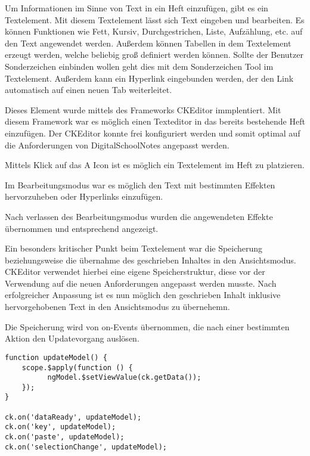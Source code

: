 Um Informationen im Sinne von Text in ein Heft einzufügen, gibt es ein Textelement. Mit diesem Textelement lässt sich Text eingeben und bearbeiten. Es können Funktionen wie Fett, Kursiv, Durchgestrichen, Liste, Aufzählung, etc. auf den Text angewendet werden. Außerdem können Tabellen in dem Textelement erzeugt werden, welche beliebig groß definiert werden können. Sollte der Benutzer Sonderzeichen einbinden wollen geht dies mit dem Sonderzeichen Tool im Textelement. Außerdem kann ein Hyperlink eingebunden werden, der den Link automatisch auf einen neuen Tab weiterleitet.

Dieses Element wurde mittels des Frameworks CKEditor immplentiert. Mit diesem Framework war es möglich einen Texteditor in das bereits bestehende Heft einzufügen. Der CKEditor konnte frei konfiguriert werden und somit optimal auf die Anforderungen von DigitalSchoolNotes angepasst werden.

Mittels Klick auf das A Icon ist es möglich ein Textelement im Heft zu platzieren.

Im Bearbeitungsmodus war es möglich den Text mit bestimmten Effekten hervorzuheben oder Hyperlinks einzufügen.

Nach verlassen des Bearbeitungsmodus wurden die angewendeten Effekte übernommen und entsprechend angezeigt.

Ein besonders kritischer Punkt beim Textelement war die Speicherung beziehungsweise die übernahme des geschrieben Inhaltes in den Ansichtsmodus. CKEditor verwendet hierbei eine eigene Speicherstruktur, diese vor der Verwendung auf die neuen Anforderungen angepasst werden musste. Nach erfolgreicher Anpassung ist es nun möglich den geschrieben Inhalt inklusive hervorgehobenen Text in den Ansichtsmodus zu übernehemn.

Die Speicherung wird von on-Events übernommen, die nach einer bestimmten Aktion den Updatevorgang auslösen.
\begin{lstlisting}[caption={Speicherung des Textelements}]
function updateModel() {
	scope.$apply(function () {
          ngModel.$setViewValue(ck.getData());
    });
}

ck.on('dataReady', updateModel);
ck.on('key', updateModel);
ck.on('paste', updateModel);
ck.on('selectionChange', updateModel);
\end{lstlisting}

